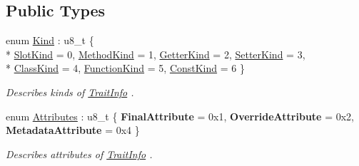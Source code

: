 \subsection*{Public Types}
\begin{DoxyCompactItemize}
\item 
enum \hyperlink{structjswf_1_1avm2_1_1_trait_info_ac0348c80fb68f4cdf615b064656d186c}{Kind} \+: u8\+\_\+t \{ \\*
\hyperlink{structjswf_1_1avm2_1_1_trait_info_ac0348c80fb68f4cdf615b064656d186ca54be18a320a594ba328e988d6e47d6e1}{Slot\+Kind} = 0, 
\hyperlink{structjswf_1_1avm2_1_1_trait_info_ac0348c80fb68f4cdf615b064656d186ca2958b48cc7705f27edab938e18f55be2}{Method\+Kind} = 1, 
\hyperlink{structjswf_1_1avm2_1_1_trait_info_ac0348c80fb68f4cdf615b064656d186ca1f3d1fd808c8bec910b581029a6d8c11}{Getter\+Kind} = 2, 
\hyperlink{structjswf_1_1avm2_1_1_trait_info_ac0348c80fb68f4cdf615b064656d186ca8c6c4099e9282f1d3eef5d152b62356d}{Setter\+Kind} = 3, 
\\*
\hyperlink{structjswf_1_1avm2_1_1_trait_info_ac0348c80fb68f4cdf615b064656d186cab64f4071132b361a32764482296a1930}{Class\+Kind} = 4, 
\hyperlink{structjswf_1_1avm2_1_1_trait_info_ac0348c80fb68f4cdf615b064656d186ca90cea2d34ca4ba5405222d363ed0b01c}{Function\+Kind} = 5, 
\hyperlink{structjswf_1_1avm2_1_1_trait_info_ac0348c80fb68f4cdf615b064656d186cafb3adb27a2109a0d37e184104d9fcb8f}{Const\+Kind} = 6
 \}
\begin{DoxyCompactList}\small\item\em Describes kinds of \hyperlink{structjswf_1_1avm2_1_1_trait_info}{Trait\+Info} . \end{DoxyCompactList}\item 
\hypertarget{structjswf_1_1avm2_1_1_trait_info_a515691f435052d053ef3314a49bce8a3}{enum \hyperlink{structjswf_1_1avm2_1_1_trait_info_a515691f435052d053ef3314a49bce8a3}{Attributes} \+: u8\+\_\+t \{ {\bfseries Final\+Attribute} = 0x1, 
{\bfseries Override\+Attribute} = 0x2, 
{\bfseries Metadata\+Attribute} = 0x4
 \}}\label{structjswf_1_1avm2_1_1_trait_info_a515691f435052d053ef3314a49bce8a3}

\begin{DoxyCompactList}\small\item\em Describes attributes of \hyperlink{structjswf_1_1avm2_1_1_trait_info}{Trait\+Info} . \end{DoxyCompactList}\end{DoxyCompactItemize}
